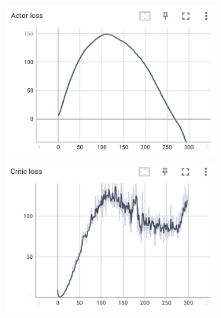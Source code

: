 \documentclass{article} %
\begin{document}
    \includegraphics[width=7cm]{./imgs/pendulum/actor_loss.png}
    \includegraphics[width=7cm]{./imgs/pendulum/critic_loss.png}\\
\end{document}
